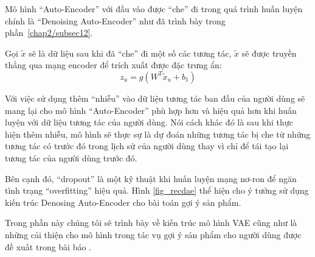     Mô hình ``Auto-Encoder'' với đầu vào được ``che'' đi trong quá trình huấn luyện chính là ``Denoising Auto-Encoder'' như đã trình bày trong phần~\ref{chap2/subsec12}.

    Gọi $\tilde{x}$ sẽ là dữ liệu sau khi đã ``che'' đi một số các tương tác, $\tilde{x}$ sẽ được truyền thẳng qua mạng encoder để trích xuất được đặc trưng ẩn:
    \begin{equation}
        \label{z_u_with_x_tilde}
        z_u = g(W^T \tilde{x}_u + b_1)
    \end{equation}

    Với việc sử dụng thêm ``nhiễu'' vào dữ liệu tương tác ban đầu của người dùng sẽ mang lại cho mô hình ``Auto-Encoder'' phù hợp hơn và hiệu quả hơn khi huấn luyện với dữ liệu tương tác của người dùng.
    Nói cách khác đó là sau khi thực hiện thêm nhiễu, mô hình sẽ thực sự là dự đoán những tương tác bị che từ những tương tác có trước đó trong lịch sử của người dùng thay vì chỉ để tái tạo lại tương tác của người dùng trước đó.

    Bên cạnh đó, ``dropout'' là một kỹ thuật khi huấn luyện mạng nơ-ron để ngăn tình trạng ``overfitting'' hiệu quả.
    Hình \ref{fig_recdae} thể hiện cho ý tưởng sử dụng kiến trúc Denosing Auto-Encoder cho bài toán gợi ý sản phẩm.     


    Trong phần này chúng tôi sẽ trình bày về kiến trúc mô hình VAE cũng như là những cải thiện cho mô hình trong tác vụ gợi ý sản phẩm cho người dùng được đề xuất trong bài báo \cite{mvae}. 

